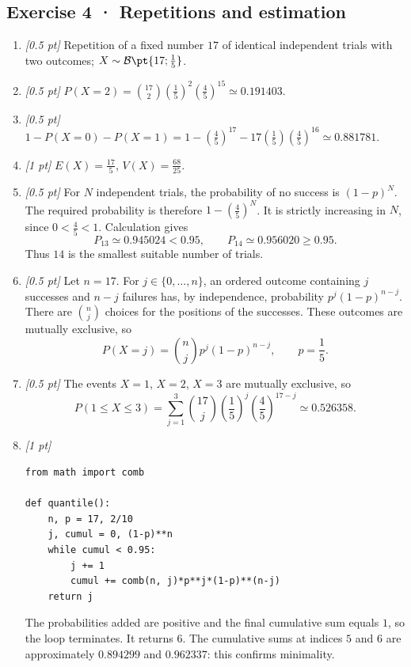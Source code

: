 \subsection*{Exercise 4 · Repetitions and estimation}\begin{enumerate}

\item \textit{[0.5 pt]} Repetition of a fixed number $17$ of identical independent trials with two outcomes; $X\sim\mathcal B\pt{17;\frac{1}{5}}$.

\item \textit{[0.5 pt]} $P(X=2)=\binom{17}2(\frac{1}{5})^2(\frac{4}{5})^{15}\simeq\num{0,191403}$.

\item \textit{[0.5 pt]} $1-P(X=0)-P(X=1)=1-(\frac{4}{5})^{17}-17(\frac{1}{5})(\frac{4}{5})^{16}\simeq\num{0,881781}$.

\item \textit{[1 pt]} $E(X)=\frac{17}{5}$, $V(X)=\frac{68}{25}$.

\item \textit{[0.5 pt]} For $N$ independent trials, the probability of no success is $(1-p)^N$. The required probability is therefore $1-(\frac{4}{5})^N$. It is strictly increasing in $N$, since $0<\frac{4}{5}<1$. Calculation gives
\[P_{13}\simeq\num{0,945024}<\num{0,95},\qquad P_{14}\simeq\num{0,956020}\ge\num{0,95}.\]
Thus $14$ is the smallest suitable number of trials.

\item \textit{[0.5 pt]} Let $n=17$. For $j\in\{0,\ldots,n\}$, an ordered outcome containing $j$ successes and $n-j$ failures has, by independence, probability $p^j(1-p)^{n-j}$. There are $\binom nj$ choices for the positions of the successes. These outcomes are mutually exclusive, so
\[P(X=j)=\binom nj p^j(1-p)^{n-j},\qquad p=\frac{1}{5}.\]

\item \textit{[0.5 pt]} The events $X=1$, $X=2$, $X=3$ are mutually exclusive, so
\[P(1\le X\le3)=\sum_{j=1}^3\binom{17}j(\frac{1}{5})^j(\frac{4}{5})^{17-j}\simeq\num{0,526358}.\]


\item \textit{[1 pt]} 
\begin{lstlisting}
from math import comb

def quantile():
    n, p = 17, 2/10
    j, cumul = 0, (1-p)**n
    while cumul < 0.95:
        j += 1
        cumul += comb(n, j)*p**j*(1-p)**(n-j)
    return j
\end{lstlisting}
The probabilities added are positive and the final cumulative sum equals $1$, so the loop terminates. It returns $6$. The cumulative sums at indices $5$ and $6$ are approximately $\num{0,894299}$ and $\num{0,962337}$: this confirms minimality.

\end{enumerate}

